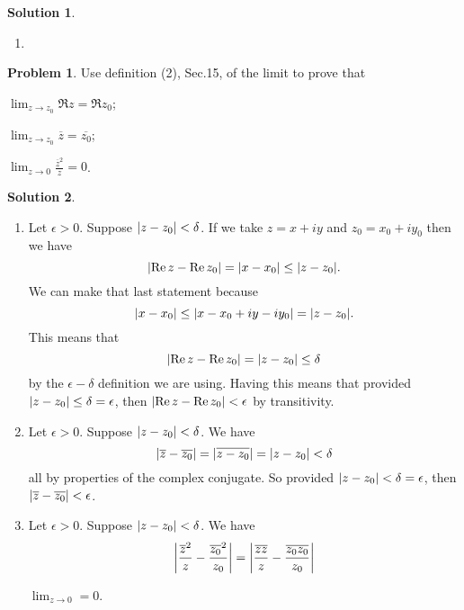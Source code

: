 \documentclass[10pt]{article}
\theoremstyle{definition}
\newtheorem{problem}{Problem}
\newtheorem{soln}{Solution}
\begin{document}
\begin{soln}
\begin{enumerate}[label=(\alph*)]
\begin{center}
\begin{tikzpicture}[scale=2]
            \end{tikzpicture}
          \end{center}
    \item ~\begin{center}
          \end{center}
  \end{enumerate}
\end{soln}
\newpage

\begin{problem}
Use definition (2), Sec.15, of the limit to prove that
\begin{center}
  \begin{enumerate*}[label=(\alph*)]
    \item $\lim_{z\to z_0}\Re z = \Re z_0$;\qquad~
    \item $\lim_{z\to z_0}\overline{z}=\overline{z_0}$;\qquad~
    \item $\lim_{z\to 0}\frac{\overline{z}^2}{z}=0$.
  \end{enumerate*}
\end{center}
\end{problem}
\begin{soln}~
  \begin{enumerate}[label=(\alph*)]
    \item Let $\epsilon>0$. Suppose $\abs{z-z_0}<\delta$. If we take $z=x+iy$ and $z_0=x_0+iy_0$ then we have
          $$\abs{\Re z-\Re z_0}=\abs{x-x_0}\leq \abs{z-z_0}.$$
          We can make that last statement because
          $$\abs{x-x_0}\leq \abs{x-x_0+iy-iy_0}=\abs{z-z_0}.$$
          This means that
          $$\abs{\Re z-\Re z_0}=\abs{z-z_0}\leq \delta$$
          by the $\epsilon-\delta$ definition we are using. Having this means that provided
          $\abs{z-z_0}\leq \delta=\epsilon$, then $\abs{\Re z-\Re z_0}<\epsilon$ by transitivity.
    \item Let $\epsilon>0$. Suppose $\abs{z-z_0}<\delta$. We have
          $$\abs{\overline{z}-\overline{z_0}}=\abs{\overline{z-z_0}}=\abs{z-z_0}<\delta$$
          all by properties of the complex conjugate. So provided $\abs{z-z_0}<\delta=\epsilon$, then
          $\abs{\overline{z}-\overline{z_0}}<\epsilon$.
    \item Let $\epsilon>0$. Suppose $\abs{z-z_0}<\delta$. We have
          $$\abs{\frac{\overline{z}^2}{z}-\frac{\overline{z_0}^2}{z_0}}=\abs{\frac{\overline{zz}}{z}-\frac{\overline{z_0z_0}}{z_0}}$$


          $\lim_{z\to 0}=0$.
  \end{enumerate}
\end{soln}
\end{document}
